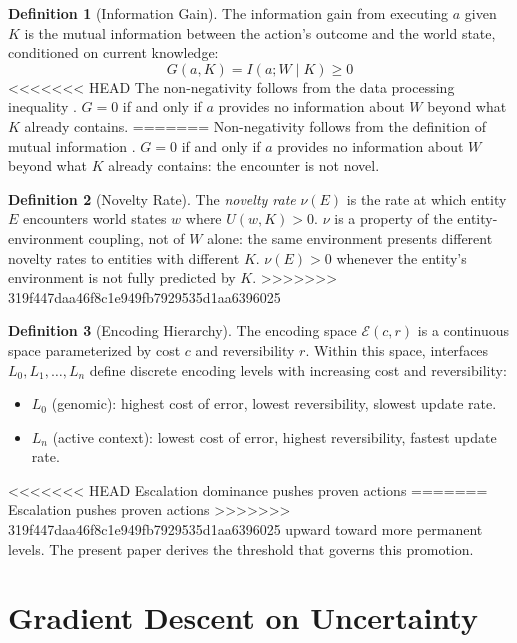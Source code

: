 \documentclass[11pt]{article}
\theoremstyle{definition}
\newtheorem{definition}{Definition}
\begin{document}
\begin{definition}[Information Gain]
\label{def:gain}
The information gain from executing $a$ given $K$ is the mutual
information between the action's outcome and the world state,
conditioned on current knowledge:
\[
G(a, K) = I(a; W \mid K) \geq 0
\]
<<<<<<< HEAD
The non-negativity follows from the data processing inequality
\cite{Cover2006}. $G = 0$ if and only if $a$ provides no information
about $W$ beyond what $K$ already contains.
=======
Non-negativity follows from the definition of mutual information
\cite{Cover2006}. $G = 0$ if and only if $a$ provides no information
about $W$ beyond what $K$ already contains: the encounter is not
novel.
\end{definition}

\begin{definition}[Novelty Rate]
\label{def:novelty}
The \emph{novelty rate} $\nu(E)$ is the rate at which entity $E$
encounters world states $w$ where $U(w, K) > 0$. $\nu$ is a property
of the entity-environment coupling, not of $W$ alone: the same
environment presents different novelty rates to entities with different
$K$. $\nu(E) > 0$ whenever the entity's environment is not fully
predicted by $K$.
>>>>>>> 319f447daa46f8c1e949fb7929535d1aa6396025
\end{definition}

\begin{definition}[Encoding Hierarchy]
\label{def:hierarchy}
The encoding space $\mathcal{E}(c, r)$ is a continuous space
parameterized by cost $c$ and reversibility $r$. Within this space,
interfaces $L_0, L_1, \ldots, L_n$ define discrete encoding levels
with increasing cost and reversibility:
\begin{itemize}
\item $L_0$ (genomic): highest cost of error, lowest reversibility,
   slowest update rate.
\item $L_n$ (active context): lowest cost of error, highest
   reversibility, fastest update rate.
\end{itemize}
<<<<<<< HEAD
Escalation dominance \cite{McCarthy2026b} pushes proven actions
=======
Escalation \cite{McCarthy2026b} pushes proven actions
>>>>>>> 319f447daa46f8c1e949fb7929535d1aa6396025
upward toward more permanent levels. The present paper derives the
threshold that governs this promotion.
\end{definition}

\section{Gradient Descent on Uncertainty}
\label{sec:gradient}
\end{document}
